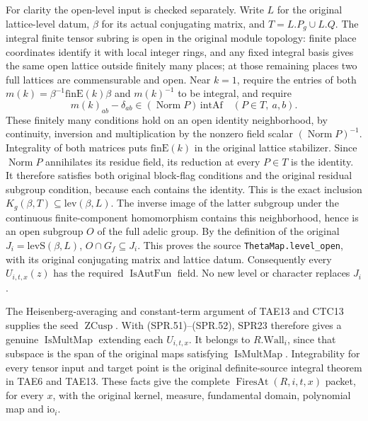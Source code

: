 For clarity the open-level input is checked separately.
Write \(L\) for the original lattice-level datum, \(\beta\) for
its actual conjugating matrix, and \(T=L.P_g\cup L.Q\).
The integral finite tensor subring is open in the original module
topology: finite place coordinates identify it with local integer
rings, and any fixed integral basis gives the same open lattice
outside finitely many places; at those remaining places two full
lattices are commensurable and open.
Near \(k=1\), require the entries of both
\(m(k)=\beta^{-1}\mathrm{finE}(k)\beta\) and \(m(k)^{-1}\)
to be integral, and require
\[
  m(k)_{ab}-\delta_{ab}
       \in(\operatorname{Norm}P)\,\mathrm{intAf}
            \quad(P\in T,\ a,b).
\]
These finitely many conditions hold on an open identity
neighborhood, by continuity, inversion and multiplication by
the nonzero field scalar \((\operatorname{Norm}P)^{-1}\).
Integrality of both matrices puts \(\mathrm{finE}(k)\) in the
original lattice stabilizer.  Since \(\operatorname{Norm}P\)
annihilates its residue field, its reduction at every \(P\in T\)
is the identity.  It therefore satisfies both original block-flag
conditions and the original residual subgroup condition, because
each contains the identity.  This is the exact inclusion
\(K_g(\beta,T)\subseteq\mathrm{lev}(\beta,L)\).
The inverse image of the latter subgroup under the continuous
finite-component homomorphism contains this neighborhood, hence
is an open subgroup \(O\) of the full adelic group.
By the definition of the original \(J_i=\mathrm{levS}(\beta,L)\),
\(O\cap G_f\subseteq J_i\).  This proves the source
\texttt{ThetaMap.\allowbreak level\_\allowbreak open}, with its original conjugating
matrix and lattice datum.  Consequently every \(U_{i,t,x}(z)\)
has the required \(\operatorname{IsAutFun}\) field.  No new
level or character replaces \(J_i\).

The Heisenberg-averaging and constant-term argument of TAE13
and CTC13 supplies the seed \(\operatorname{ZCusp}\).
With (SPR.51)--(SPR.52), SPR23 therefore gives a genuine
\(\operatorname{IsMultMap}\) extending each \(U_{i,t,x}\).
It belongs to \(R.\mathrm{Wall}_i\), since that subspace is the
span of the original maps satisfying \(\operatorname{IsMultMap}\).
Integrability for every tensor input and target point is the
original definite-source integral theorem in TAE6 and TAE13.
These facts give the complete \(\operatorname{FiresAt}(R,i,t,x)\)
packet, for every \(x\), with the original kernel, measure,
fundamental domain, polynomial map and \(\mathrm{io}_i\).

